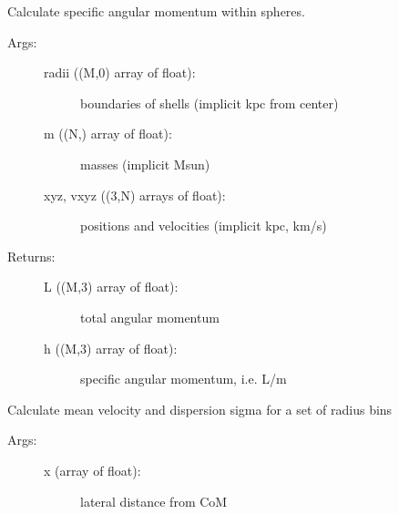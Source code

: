\documentclass[letterpaper,10pt,english]{sphinxmanual}
\begin{document}
\begin{fulllineitems}
\begin{fulllineitems}
\label{\detokenize{centerofmass:galaxy.centerofmass.CenterOfMass.sphere_h}}
Calculate specific angular momentum within spheres.
\begin{description}
\item[{Args:}] \leavevmode\begin{description}
\item[{radii ((M,0) array of float):}] \leavevmode
boundaries of shells (implicit kpc from center)

\item[{m ((N,) array of float):}] \leavevmode
masses (implicit Msun)

\item[{xyz, vxyz ((3,N) arrays of float):}] \leavevmode
positions and velocities (implicit kpc, km/s)

\end{description}

\item[{Returns:}] \leavevmode\begin{description}
\item[{L ((M,3) array of float):}] \leavevmode
total angular momentum

\item[{h ((M,3) array of float):}] \leavevmode
specific angular momentum, i.e. L/m

\end{description}

\end{description}

\end{fulllineitems}


\begin{fulllineitems}
\label{\detokenize{centerofmass:galaxy.centerofmass.CenterOfMass.disp_by_radius}}
Calculate mean velocity and dispersion sigma for a set of radius bins
\begin{description}
\item[{Args:}] \leavevmode\begin{description}
\item[{x (array of float):}] \leavevmode
lateral distance from CoM


\end{description}
\end{description}
\end{fulllineitems}
\end{fulllineitems}
\end{document}
